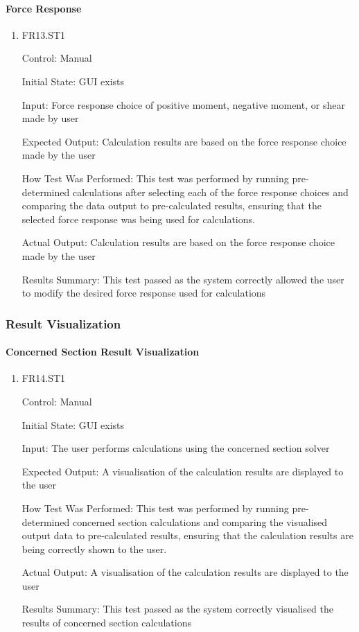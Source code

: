 \documentclass[12pt, titlepage]{article}
\begin{document}
\paragraph{Force Response}

\begin{enumerate}

\item{FR13.ST1\\}

Control: Manual
					
Initial State: GUI exists
					
Input: Force response choice of positive moment, negative moment, or shear made by user
					
Expected Output: Calculation results are based on the force response choice made by the user

How Test Was Performed: This test was performed by running pre-determined calculations after selecting each of the force response choices and comparing the data output to pre-calculated results, ensuring that the selected force response was being used for calculations.
					
Actual Output: Calculation results are based on the force response choice made by the user

Results Summary: This test passed as the system correctly allowed the user to modify the desired force response used for calculations
				
\end{enumerate}

\subsubsection{Result Visualization}

\paragraph{Concerned Section Result Visualization}

\begin{enumerate}

\item{FR14.ST1\\}

Control: Manual
				
Initial State: GUI exists
					
Input: The user performs calculations using the concerned section solver
					
Expected Output: A visualisation of the calculation results are displayed to the user

How Test Was Performed: This test was performed by running pre-determined concerned section calculations and comparing the visualised output data to pre-calculated results, ensuring that the calculation results are being correctly shown to the user. 
			
Actual Output: A visualisation of the calculation results are displayed to the user

Results Summary: This test passed as the system correctly visualised the results of concerned section calculations
				
\end{enumerate}
\end{document}
